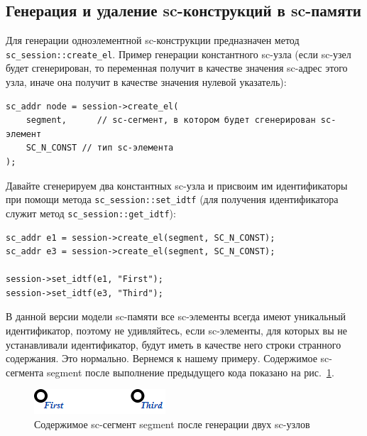 \subsection{Генерация и удаление sc-конструкций в sc-памяти}

Для генерации одноэлементной sc-конструкции предназначен метод
\lstinline{sc_session::create_el}. Пример генерации константного
sc-узла (если sc-узел будет сгенерирован, то переменная получит в
качестве значения sc-адрес этого узла, иначе она получит в качестве
значения нулевой указатель):

\begin{lstlisting}[texcl]
sc_addr node = session->create_el(
    segment,      // sc-сегмент, в котором будет сгенерирован sc-элемент
    SC_N_CONST // тип sc-элемента
);
\end{lstlisting}

Давайте сгенерируем два константных sc-узла и присвоим им
идентификаторы при помощи метода \lstinline{sc_session::set_idtf} (для
получения идентификатора служит метод
\lstinline{sc_session::get_idtf}):

\begin{lstlisting}[texcl]
sc_addr e1 = session->create_el(segment, SC_N_CONST);
sc_addr e3 = session->create_el(segment, SC_N_CONST);

session->set_idtf(e1, "First");
session->set_idtf(e3, "Third");
\end{lstlisting}

В данной версии модели sc-памяти все sc-элементы всегда имеют
уникальный идентификатор, поэтому не удивляйтесь, если sc-элементы,
для которых вы не устанавливали идентификатор, будут иметь в качестве
него строки странного содержания. Это нормально. Вернемся к нашему
примеру.  Содержимое sc-сегмента segment после выполнение предыдущего
кода показано на рис.~\ref{fig:gen3_f_a_f_before}.

\begin{figure}
  \centering
  \includegraphics{images/4/gen/gen3_f_a_f_before}
  \caption{Содержимое sc-сегмент segment после генерации двух sc-узлов}
  \label{fig:gen3_f_a_f_before}
\end{figure}

